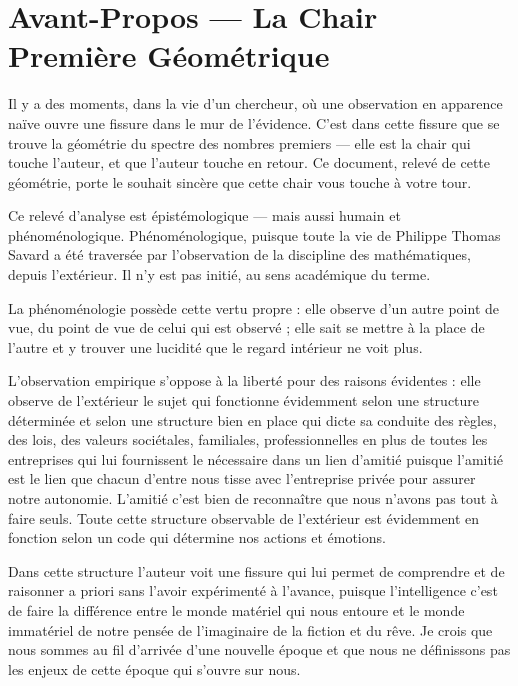 \documentclass[11pt,a4paper]{article}
\begin{document}
\section*{Avant-Propos --- La Chair Première Géométrique}

Il y a des moments, dans la vie d'un chercheur, où une observation en apparence naïve ouvre une fissure dans le mur de l'évidence. C'est dans cette fissure que se trouve la géométrie du spectre des nombres premiers --- elle est la chair qui touche l'auteur, et que l'auteur touche en retour. Ce document, relevé de cette géométrie, porte le souhait sincère que cette chair vous touche à votre tour.

Ce relevé d'analyse est épistémologique --- mais aussi humain et phénoménologique. Phénoménologique, puisque toute la vie de Philippe Thomas Savard a été traversée par l'observation de la discipline des mathématiques, depuis l'extérieur. Il n'y est pas initié, au sens académique du terme.

La phénoménologie possède cette vertu propre : elle observe d'un autre point de vue, du point de vue de celui qui est observé ; elle sait se mettre à la place de l'autre et y trouver une lucidité que le regard intérieur ne voit plus.

L'observation empirique s'oppose à la liberté pour des raisons évidentes : elle observe de l'extérieur le sujet qui fonctionne évidemment selon une structure déterminée et selon une structure bien en place qui dicte sa conduite des règles, des lois, des valeurs sociétales, familiales, professionnelles en plus de toutes les entreprises qui lui fournissent le nécessaire dans un lien d'amitié puisque l'amitié est le lien que chacun d'entre nous tisse avec l'entreprise privée pour assurer notre autonomie. L'amitié c'est bien de reconnaître que nous n'avons pas tout à faire seuls. Toute cette structure observable de l'extérieur est évidemment en fonction selon un code qui détermine nos actions et émotions.

Dans cette structure l'auteur voit une fissure qui lui permet de comprendre et de raisonner a priori sans l'avoir expérimenté à l'avance, puisque l'intelligence c'est de faire la différence entre le monde matériel qui nous entoure et le monde immatériel de notre pensée de l'imaginaire de la fiction et du rêve. Je crois que nous sommes au fil d'arrivée d'une nouvelle époque et que nous ne définissons pas les enjeux de cette époque qui s'ouvre sur nous.
\end{document}
